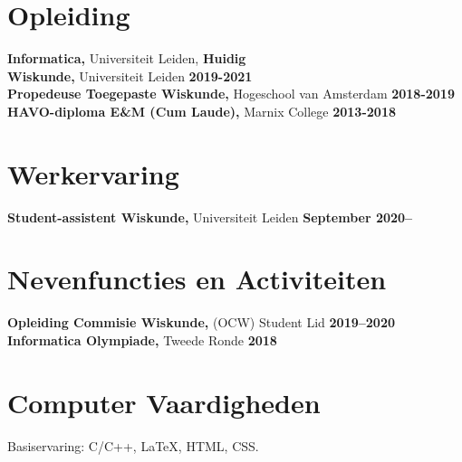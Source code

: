 \documentclass[margin,line]{res}
\begin{document}
\newcommand{\myname}{Tim ~Greven}
\newlength{\mynamewidth}
\settowidth{\mynamewidth}{\namefont\myname}

\name{\hspace*{0.5\textwidth}\hspace{-0.5\mynamewidth} \myname \vspace*{.1in}}






\section{\sc Opleiding}
{\bf Informatica,} Universiteit Leiden, \hfill {\bf Huidig}\\
{\bf Wiskunde,} Universiteit Leiden \hfill {\bf 2019-2021}\\
{\bf Propedeuse Toegepaste Wiskunde,} Hogeschool van Amsterdam \hfill {\bf 2018-2019}\\
{\bf HAVO-diploma E\&M (Cum Laude),} Marnix College \hfill {\bf 2013-2018}\\


\section{\sc Werkervaring}
{\bf Student-assistent Wiskunde,} Universiteit Leiden \hfill {\bf September 2020--}\\

\vspace{-1em}


\vspace{-1em}


\section{\sc Nevenfuncties en Activiteiten}
{\bf Opleiding Commisie Wiskunde,} (OCW) Student Lid \hfill{\bf 2019--2020}
\\
{\bf Informatica Olympiade,} Tweede Ronde \hfill{\bf 2018}



\section{\sc Computer Vaardigheden}
Basiservaring: C/C++, \LaTeX, HTML, CSS.
\end{document}
